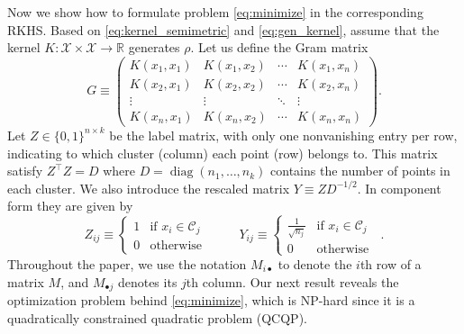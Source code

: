 \documentclass[aps,preprint,nofootinbib,floatfix]{revtex4-1}
\DeclareMathOperator{\diag}{diag}
\newcommand\kk{K}
\newcommand\C{{\mathcal{C}}}
\newcommand\Zt{Y}
\begin{document}
Now we show how to formulate problem \eqref{eq:minimize} in the corresponding
RKHS.
Based on 
\eqref{eq:kernel_semimetric} and \eqref{eq:gen_kernel}, assume that 
the kernel $\kk: \mathcal{X} \times \mathcal{X} \to \mathbb{R}$ 
generates $\rho$. 
Let us define  the Gram matrix
\begin{equation}
\label{eq:kernel_matrix}
G \equiv \begin{pmatrix}
\kk(x_1,x_1) & \kk(x_1,x_2) & \dotsm & \kk(x_1,x_n) \\
\kk(x_2,x_1) & \kk(x_2,x_2) & \dotsm & \kk(x_2,x_n) \\
\vdots & \vdots & \ddots  & \vdots \\
\kk(x_n,x_1) & \kk(x_n,x_2) & \dotsm & \kk(x_n,x_n) 
\end{pmatrix} .
\end{equation}
Let $Z \in \{ 0,1 \}^{n\times k}$ be the label matrix, 
with only one nonvanishing entry per row, 
indicating to which cluster (column)
each point (row) belongs to. This matrix satisfy
$Z^\top Z = D$ where $D = \diag( n_1,\dotsc, n_k )$  contains
the number of points in each cluster. We also introduce the rescaled
matrix  $Y \equiv Z D^{-1/2}$. In component form they are given by
\begin{equation}
\label{eq:label_matrix}
Z_{ij} \equiv \begin{cases}
1 & \mbox{if $x_i \in \C_j$ } \\
0 & \mbox{otherwise}
\end{cases} \qquad
\Zt_{ij} \equiv \begin{cases}
\tfrac{1}{\sqrt{n_j}} & \mbox{if $x_i \in \C_j$ } \\
0 & \mbox{otherwise}
\end{cases} .
\end{equation}
Throughout the paper, we use the notation $M_{i\bullet}$ to denote
the $i$th row of a matrix $M$, and $M_{\bullet j}$ denotes its $j$th column.
Our next result reveals the optimization problem behind \eqref{eq:minimize},
which is NP-hard since
it is a quadratically constrained quadratic problem (QCQP).
\end{document}
